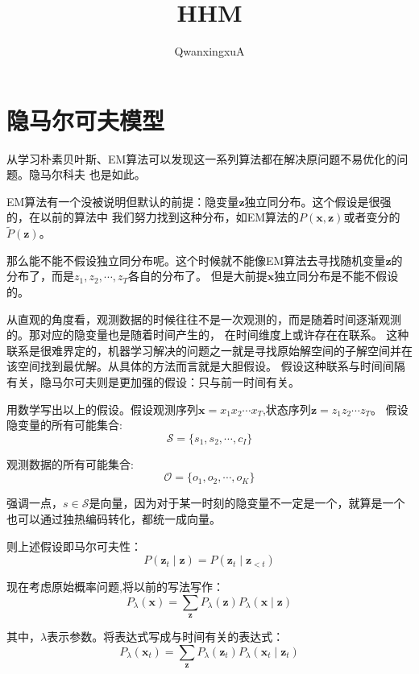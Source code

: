 \documentclass{article}
\title{HHM}
\author{QwanxingxuA}
\begin{document}
\maketitle
    \section{隐马尔可夫模型}
        从学习朴素贝叶斯、EM算法可以发现这一系列算法都在解决原问题不易优化的问题。隐马尔科夫
        也是如此。

        EM算法有一个没被说明但默认的前提：隐变量$\boldsymbol{z}$独立同分布。这个假设是很强的，在以前的算法中
        我们努力找到这种分布，如EM算法的$P(\boldsymbol{x},\boldsymbol{z})$或者变分的$\widetilde{P}(\boldsymbol{z})$。

        那么能不能不假设独立同分布呢。这个时候就不能像EM算法去寻找随机变量$\boldsymbol{z}$的分布了，而是$z_1,z_2,\cdots,z_T$各自的分布了。
        但是大前提$\boldsymbol{x}$独立同分布是不能不假设的。

        从直观的角度看，观测数据的时候往往不是一次观测的，而是随着时间逐渐观测的。那对应的隐变量也是随着时间产生的，
        在时间维度上或许存在在联系。
        这种联系是很难界定的，机器学习解决的问题之一就是寻找原始解空间的子解空间并在该空间找到最优解。从具体的方法而言就是大胆假设。
        假设这种联系与时间间隔有关，隐马尔可夫则是更加强的假设：只与前一时间有关。

        用数学写出以上的假设。假设观测序列$\boldsymbol{x}=x_1x_2\cdots x_T$,状态序列$\boldsymbol{z}=z_1z_2\cdots z_T$。
        假设隐变量的所有可能集合:
        \[\mathcal{S}=\{s_1,s_2,\cdots,c_I\}\]

        观测数据的所有可能集合:
        \[\mathcal{O}=\{o_1,o_2,\cdots,o_K\}\]

        强调一点，$s\in\mathcal{S}$是向量，因为对于某一时刻的隐变量不一定是一个，就算是一个也可以通过独热编码转化，都统一成向量。

        则上述假设即马尔可夫性：
        \[P(\boldsymbol{z}_t\mid\boldsymbol{z})=P(\boldsymbol{z}_t\mid \boldsymbol{z}_{<t})\]
        
        现在考虑原始概率问题,将以前的写法写作：
        \[P_\lambda(\boldsymbol{x})=\sum_{\boldsymbol{z}}P_\lambda(\boldsymbol{z})P_\lambda(\boldsymbol{x}\mid\boldsymbol{z})\]
    
        其中，$\lambda$表示参数。将表达式写成与时间有关的表达式：
        \[P_\lambda(\boldsymbol{x}_t)=\sum_{\boldsymbol{z}}P_\lambda(\boldsymbol{z}_t)P_\lambda(\boldsymbol{x}_t\mid\boldsymbol{z}_t)\]
\end{document}

